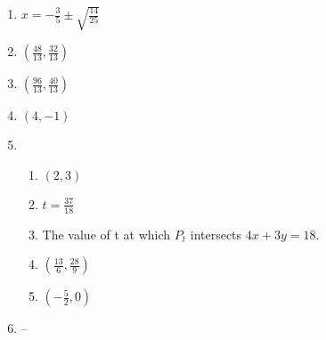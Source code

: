 \documentclass{article}
\begin{document}
\begin{enumerate}
\item $x = -\frac{3}{5} \pm \sqrt{\frac{14}{25}}$

\item $(\frac{48}{13}, \frac{32}{13})$

\item $(\frac{96}{13}, \frac{40}{13})$

\item $(4, -1)$

\item

	\begin{enumerate}
	
	\item $(2, 3)$
	
	\item $t = \frac{37}{18}$
	
	\item The value of t at which $P_t$ intersects $4x + 3y = 18$.
	
	\item $(\frac{13}{6}, \frac{28}{9})$
	
	\item $(-\frac{5}{2}, 0)$
	
	\end{enumerate}
	
\item --
	
\end{enumerate}
\end{document}
